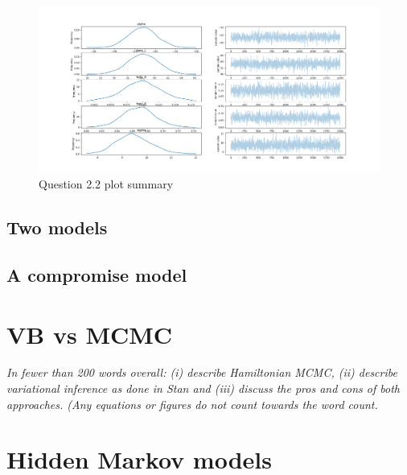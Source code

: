 \documentclass[11pt,a4paper]{article}
\begin{document}
  \begin{figure}[htb]
    \centering
      \includegraphics[width=\textwidth]{../q22/q22_plot_summary.png}
      \caption{Question 2.2 plot summary}
    \label{fig:2.2}
  \end{figure}

  \subsection{Two models}

  \subsection{A compromise model}

\section{VB vs MCMC}

\textit{In fewer than 200 words overall: (i) describe Hamiltonian MCMC, (ii) describe variational inference as done in Stan and (iii) discuss the pros and cons of both approaches. (Any equations or figures do not count towards the word count.}

\section{Hidden Markov models}

\printbibliography
\end{document}
